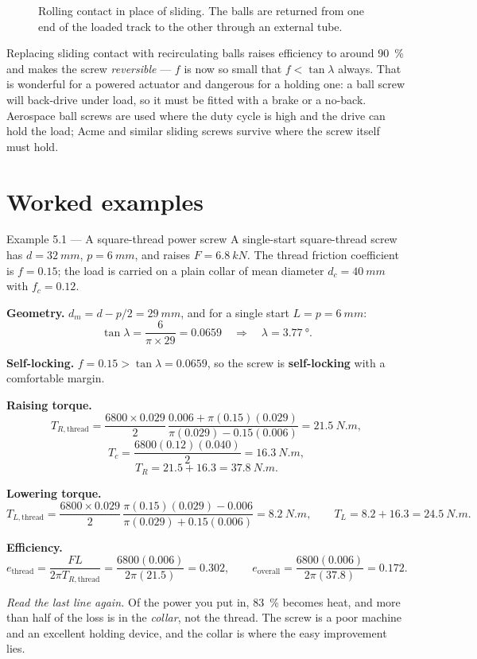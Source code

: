 \documentclass[11pt,a4paper]{article}
\begin{document}
\begin{figure}[H]\centering
\resizebox{0.95\textwidth}{!}{}
\caption{Rolling contact in place of sliding. The balls are returned from one end of the loaded track
to the other through an external tube.}
\end{figure}

Replacing sliding contact with recirculating balls raises efficiency to around \SI{90}{\percent} and
makes the screw \emph{reversible} --- $f$ is now so small that $f < \tan\lambda$ always. That is
wonderful for a powered actuator and dangerous for a holding one: a ball screw will back-drive under
load, so it must be fitted with a brake or a no-back. Aerospace ball screws are used where the duty
cycle is high and the drive can hold the load; Acme and similar sliding screws survive where the
screw itself must hold.

\section{Worked examples}

\begin{examplebox}{Example 5.1 --- A square-thread power screw}
A single-start square-thread screw has $d = \SI{32}{mm}$, $p = \SI{6}{mm}$, and raises
$F = \SI{6.8}{kN}$. The thread friction coefficient is $f = 0.15$; the load is carried on a plain
collar of mean diameter $d_c = \SI{40}{mm}$ with $f_c = 0.12$.

\medskip
\textbf{Geometry.} $d_m = d - p/2 = \SI{29}{mm}$, and for a single start $L = p = \SI{6}{mm}$:
\[
\tan\lambda = \frac{6}{\pi\times 29} = 0.0659 \quad\Rightarrow\quad \lambda = \SI{3.77}{\degree}.
\]

\textbf{Self-locking.} $f = 0.15 > \tan\lambda = 0.0659$, so the screw is \textbf{self-locking} with a
comfortable margin.

\textbf{Raising torque.}
\[
T_{R,\text{thread}} = \frac{6800\times0.029}{2}\,
\frac{0.006 + \pi(0.15)(0.029)}{\pi(0.029) - 0.15(0.006)} = \SI{21.5}{N.m},
\]
\[
T_c = \frac{6800(0.12)(0.040)}{2} = \SI{16.3}{N.m},
\]
\[
T_R = 21.5 + 16.3 = \SI{37.8}{N.m}.
\]

\textbf{Lowering torque.}
\[
T_{L,\text{thread}} = \frac{6800\times0.029}{2}\,\frac{\pi(0.15)(0.029) - 0.006}{\pi(0.029) + 0.15(0.006)}
= \SI{8.2}{N.m},
\qquad T_L = 8.2 + 16.3 = \SI{24.5}{N.m}.
\]

\textbf{Efficiency.}
\[
e_{\text{thread}} = \frac{FL}{2\pi T_{R,\text{thread}}} = \frac{6800(0.006)}{2\pi(21.5)} = 0.302,
\qquad
e_{\text{overall}} = \frac{6800(0.006)}{2\pi(37.8)} = 0.172 .
\]

\medskip
\emph{Read the last line again.} Of the power you put in, \SI{83}{\percent} becomes heat, and more than
half of the loss is in the \emph{collar}, not the thread. The screw is a poor machine and an excellent
holding device, and the collar is where the easy improvement lies.
\end{examplebox}
\end{document}
